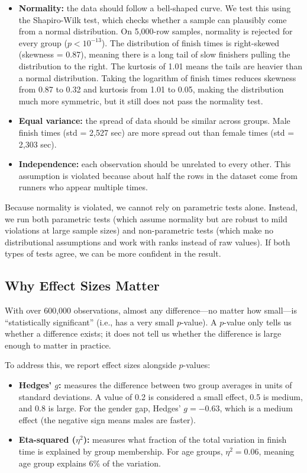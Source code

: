 \documentclass[conference]{IEEEtran}
\begin{document}
\begin{itemize}
    \item \textbf{Normality:} the data should follow a bell-shaped curve. We test this using the Shapiro-Wilk test, which checks whether a sample can plausibly come from a normal distribution. On 5,000-row samples, normality is rejected for every group ($p < 10^{-13}$). The distribution of finish times is right-skewed (skewness = 0.87), meaning there is a long tail of slow finishers pulling the distribution to the right. The kurtosis of 1.01 means the tails are heavier than a normal distribution. Taking the logarithm of finish times reduces skewness from 0.87 to 0.32 and kurtosis from 1.01 to 0.05, making the distribution much more symmetric, but it still does not pass the normality test.

    \item \textbf{Equal variance:} the spread of data should be similar across groups. Male finish times (std = 2,527 sec) are more spread out than female times (std = 2,303 sec).

    \item \textbf{Independence:} each observation should be unrelated to every other. This assumption is violated because about half the rows in the dataset come from runners who appear multiple times.
\end{itemize}

Because normality is violated, we cannot rely on parametric tests alone. Instead, we run both parametric tests (which assume normality but are robust to mild violations at large sample sizes) and non-parametric tests (which make no distributional assumptions and work with ranks instead of raw values). If both types of tests agree, we can be more confident in the result.

\subsection{Why Effect Sizes Matter}

With over 600,000 observations, almost any difference---no matter how small---is ``statistically significant'' (i.e., has a very small $p$-value). A $p$-value only tells us whether a difference exists; it does not tell us whether the difference is large enough to matter in practice.

To address this, we report effect sizes alongside $p$-values:
\begin{itemize}
    \item \textbf{Hedges' $g$:} measures the difference between two group averages in units of standard deviations. A value of 0.2 is considered a small effect, 0.5 is medium, and 0.8 is large. For the gender gap, Hedges' $g = -0.63$, which is a medium effect (the negative sign means males are faster).
    \item \textbf{Eta-squared ($\eta^2$):} measures what fraction of the total variation in finish time is explained by group membership. For age groups, $\eta^2 = 0.06$, meaning age group explains 6\% of the variation.
\end{itemize}
\end{document}
